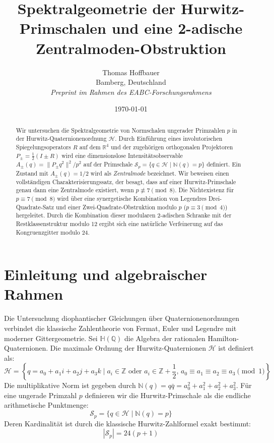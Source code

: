 \documentclass[11pt,a4paper]{article}
\title{\textbf{Spektralgeometrie der Hurwitz-Primschalen und eine 2-adische Zentralmoden-Obstruktion}}
\author{Thomas Hoffbauer \\ \small Bamberg, Deutschland \\ \small \textit{Preprint im Rahmen des EABC-Forschungsrahmens}}
\date{\today}
\begin{document}
\maketitle

\begin{abstract}
Wir untersuchen die Spektralgeometrie von Normschalen ungerader Primzahlen $p$ in der Hurwitz-Quaternionenordnung $\mathcal{H}$. Durch Einführung eines involutorischen Spiegelungsoperators $R$ auf dem $\mathbb{R}^4$ und der zugehörigen orthogonalen Projektoren $P_\pm = \frac{1}{2}(I \pm R)$ wird eine dimensionslose Intensitätsobservable $A_\pm(q) = \|P_\pm q^2\|^2 / p^2$ auf der Primschale $\mathcal{S}_p = \{q \in \mathcal{H} \mid \mathbb{N}(q) = p\}$ definiert. Ein Zustand mit $A_\pm(q) = 1/2$ wird als \emph{Zentralmode} bezeichnet. Wir beweisen einen vollständigen Charakterisierungssatz, der besagt, dass auf einer Hurwitz-Primschale genau dann eine Zentralmode existiert, wenn $p \not\equiv 7 \pmod 8$. Die Nichtexistenz für $p \equiv 7 \pmod 8$ wird über eine synergetische Kombination von Legendres Drei-Quadrate-Satz und einer Zwei-Quadrate-Obstruktion modulo $p$ ($p \equiv 3 \pmod 4$) hergeleitet. Durch die Kombination dieser modularen 2-adischen Schranke mit der Restklassenstruktur modulo 12 ergibt sich eine natürliche Verfeinerung auf das Kongruenzgitter modulo 24.
\end{abstract}

\section{Einleitung und algebraischer Rahmen}

Die Untersuchung diophantischer Gleichungen über Quaternionenordnungen verbindet die klassische Zahlentheorie von Fermat, Euler und Legendre mit moderner Gittergeometrie. Sei $\mathbb{H}(\mathbb{Q})$ die Algebra der rationalen Hamilton-Quaternionen. Die maximale Ordnung der Hurwitz-Quaternionen $\mathcal{H}$ ist definiert als:
$$\mathcal{H} = \left\{ q = a_0 + a_1 i + a_2 j + a_3 k \mid a_i \in \mathbb{Z} \text{ oder } a_i \in \mathbb{Z} + \frac{1}{2}, \, a_0 \equiv a_1 \equiv a_2 \equiv a_3 \pmod 1 \right\}$$
Die multiplikative Norm ist gegeben durch $\mathbb{N}(q) = q\bar{q} = a_0^2 + a_1^2 + a_2^2 + a_3^2$. Für eine ungerade Primzahl $p$ definieren wir die Hurwitz-Primschale als die endliche arithmetische Punktmenge:
$$\mathcal{S}_p = \{q \in \mathcal{H} \mid \mathbb{N}(q) = p\}$$
Deren Kardinalität ist durch die klassische Hurwitz-Zahlformel exakt bestimmt:
$$|\mathcal{S}_p| = 24(p + 1)$$
\end{document}
